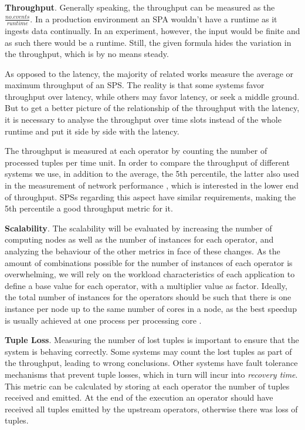 \documentclass[ppgc,diss,english]{iiufrgs}
\begin{document}
\textbf{Throughput}. Generally speaking, the throughput can be measured as the $\frac{no. events}{runtime}$. In a production environment an SPA wouldn't have a runtime as it ingests data continually. In an experiment, however, the input would be finite and as such there would be a runtime. Still, the given formula hides the variation in the throughput, which is by no means steady.

As opposed to the latency, the majority of related works measure the average or maximum throughput of an SPS. The reality is that some systems favor throughput over latency, while others may favor latency, or seek a middle ground. But to get a better picture of the relationship of the throughput with the latency, it is necessary to analyse the throughput over time slots instead of the whole runtime and put it side by side with the latency.

The throughput is measured at each operator by counting the number of processed tuples per time unit. In order to compare the throughput of different systems we use, in addition to the average, the 5th percentile, the latter also used in the measurement of network performance \cite{litjens2010potential, landstrom2011deployment}, which is interested in the lower end of throughput. SPSs regarding this aspect have similar requirements, making the 5th percentile a good throughput metric for it.

\textbf{Scalability}. The scalability will be evaluated by increasing the number of computing nodes as well as the number of instances for each operator, and analyzing the behaviour of the other metrics in face of these changes. As the amount of combinations possible for the number of instances of each operator is overwhelming, we will rely on the workload characteristics of each application to define a base value for each operator, with a multiplier value as factor. Ideally, the total number of instances for the operators should be such that there is one instance per node up to the same number of cores in a node, as the best speedup is usually achieved at one process per processing core \cite{ravi2009performance, chai2007understanding}.

\textbf{Tuple Loss}. Measuring the number of lost tuples is important to ensure that the system is behaving correctly. Some systems may count the lost tuples as part of the throughput, leading to wrong conclusions. Other systems have fault tolerance mechanisms that prevent tuple losses, which in turn will incur into \emph{recovery time}. This metric can be calculated by storing at each operator the number of tuples received and emitted. At the end of the execution an operator should have received all tuples emitted by the upstream operators, otherwise there was loss of tuples.
\end{document}
